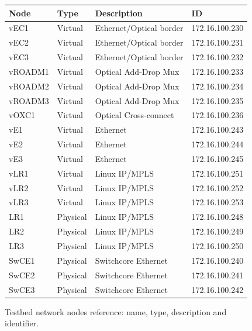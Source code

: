 \documentclass[10pt,a4paper]{report}
\begin{document}
\begin{figure}[!htbp]
  \begin{center}
    \begin{tabular}{|l|l|l|l|}
      \hline
      Node & Type & Description & ID \\ \hline
      vEC1 & Virtual & Ethernet/Optical border & 172.16.100.230 \\
      vEC2 & Virtual & Ethernet/Optical border & 172.16.100.231 \\
      vEC3 & Virtual & Ethernet/Optical border & 172.16.100.232 \\
      vROADM1 & Virtual & Optical Add-Drop Mux & 172.16.100.233 \\
      vROADM2 & Virtual & Optical Add-Drop Mux & 172.16.100.234 \\
      vROADM3 & Virtual & Optical Add-Drop Mux & 172.16.100.235 \\
      vOXC1 & Virtual & Optical Cross-connect & 172.16.100.236 \\
      vE1 & Virtual & Ethernet & 172.16.100.243 \\
      vE2 & Virtual & Ethernet & 172.16.100.244 \\
      vE3 & Virtual & Ethernet & 172.16.100.245 \\
      vLR1 & Virtual & Linux IP/MPLS & 172.16.100.251 \\
      vLR2 & Virtual & Linux IP/MPLS & 172.16.100.252 \\
      vLR3 & Virtual & Linux IP/MPLS & 172.16.100.253 \\
      LR1 & Physical & Linux IP/MPLS & 172.16.100.248 \\
      LR2 & Physical & Linux IP/MPLS & 172.16.100.249 \\
      LR3 & Physical & Linux IP/MPLS & 172.16.100.250 \\
      SwCE1 & Physical & Switchcore Ethernet & 172.16.100.240 \\
      SwCE2 & Physical & Switchcore Ethernet & 172.16.100.241 \\
      SwCE3 & Physical & Switchcore Ethernet & 172.16.100.242 \\
      \hline
    \end{tabular}
    \caption[Testbed network nodes]{Testbed network nodes reference:
      name, type, description and identifier.}
    \label{fig:testbed_legend}
  \end{center}
\end{figure}
\end{document}
